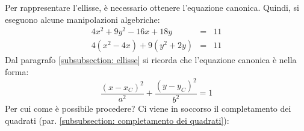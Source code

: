 \documentclass[a4paper]{article}
\begin{document}
	\noindent
	Per rappresentare l'ellisse, è necessario ottenere l'equazione canonica. Quindi, si eseguono alcune manipolazioni algebriche:
	\begin{equation*}
		\begin{array}{rcl}
			4x^{2} + 9y^{2} - 16x + 18y &=& 11 \\ [.3em]
			4\left(x^{2} - 4x\right) + 9\left(y^{2} + 2y\right) &=& 11
		\end{array}
	\end{equation*}
	Dal paragrafo \ref{subsubsection: ellisse} si ricorda che l'equazione canonica è nella forma:
	\begin{equation*}
		\dfrac{\left(x-x_{C}\right)^{2}}{a^{2}} + \dfrac{\left(y-y_{C}\right)^{2}}{b^{2}} = 1
	\end{equation*}
	Per cui come è possibile procedere? Ci viene in soccorso il completamento dei quadrati (par. \ref{subsubsection: completamento dei quadrati}):
\end{document}
